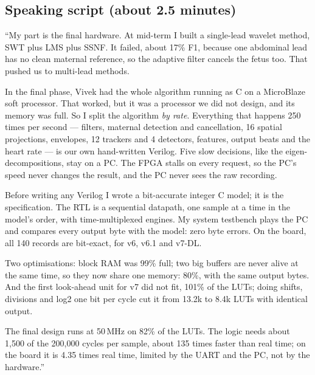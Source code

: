 \documentclass[11pt]{article}
\begin{document}
\subsection{Speaking script (about 2.5 minutes)}
\begin{simple}
``My part is the final hardware. At mid-term I built a single-lead wavelet method, SWT plus LMS plus SSNF. It failed, about 17\% F1, because one abdominal lead has no clean maternal reference, so the adaptive filter cancels the fetus too. That pushed us to multi-lead methods.

In the final phase, Vivek had the whole algorithm running as C on a MicroBlaze soft processor. That worked, but it was a processor we did not design, and its memory was full. So I split the algorithm \emph{by rate}. Everything that happens 250 times per second --- filters, maternal detection and cancellation, 16 spatial projections, envelopes, 12 trackers and 4 detectors, features, output beats and the heart rate --- is our own hand-written Verilog. Five slow decisions, like the eigen-decompositions, stay on a PC. The FPGA stalls on every request, so the PC's speed never changes the result, and the PC never sees the raw recording.

Before writing any Verilog I wrote a bit-accurate integer C model; it is the specification. The RTL is a sequential datapath, one sample at a time in the model's order, with time-multiplexed engines. My system testbench plays the PC and compares every output byte with the model: zero byte errors. On the board, all 140 records are bit-exact, for v6, v6.1 and v7-DL.

Two optimisations: block RAM was 99\% full; two big buffers are never alive at the same time, so they now share one memory: 80\%, with the same output bytes. And the first look-ahead unit for v7 did not fit, 101\% of the LUTs; doing shifts, divisions and log2 one bit per cycle cut it from 13.2k to 8.4k LUTs with identical output.

The final design runs at 50\,MHz on 82\% of the LUTs. The logic needs about 1,500 of the 200,000 cycles per sample, about 135 times faster than real time; on the board it is 4.35 times real time, limited by the UART and the PC, not by the hardware.''
\end{simple}
\end{document}
